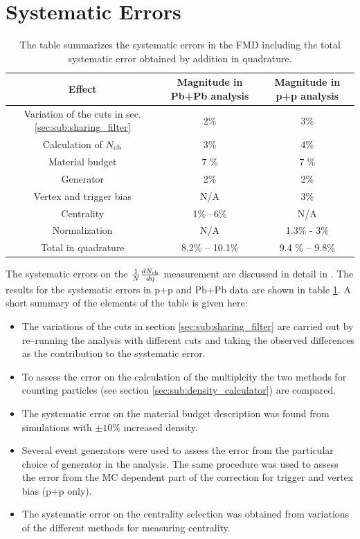 \documentclass[11pt]{article}
\newcommand{\mult}[1][]{\ensuremath N_{\text{ch}#1}}
\newcommand{\dndeta}[1][]{{\ensuremath%
    \ifx|#1|\else\left.\fi%
    \frac{1}{N}\frac{d\mult{}}{d\eta}%
    \ifx|#1|\else\right|_{#1}\fi%
}}
\begin{document}
\section{Systematic Errors} \label{fmdsysterror} 
\begin{table} 
\centering
\begin{tabular}{|c|c|c|}
\hline
 Effect & Magnitude in Pb+Pb analysis & Magnitude in p+p
 analysis \\
\hline
 Variation of the cuts in sec. \ref{sec:sub:sharing_filter} & 2\%   &  3\% \\
\hline
Calculation of $\mult$ & 3\%   &  4\% \\
\hline
 Material budget   & 7 \%  & 7 \%  \\
\hline
 Generator    & 2\%  & 2\%   \\
\hline
Vertex and trigger bias    & N/A  &  3\%  \\
\hline
 Centrality   & 1\% --6\%   & N/A  \\
\hline
 Normalization   & N/A  &  1.3\% - 3\% \\
\hline
\hline
Total in quadrature & 8.2\% -- 10.1\% & 9.4 \% -- 9.8\% \\
\hline
\end{tabular}
\caption[Systematic Errors in the FMD]{The table summarizes the
  systematic errors in the FMD including the total systematic error
  obtained by addition in quadrature.} \label{systerrors} 
\end{table}
The systematic errors on the $\dndeta$ measurement are discussed in detail in 
\cite{hhd:2009}. The results for the systematic errors in p+p and
Pb+Pb data are shown in table \ref{systerrors}. A short summary of the elements of the table is given here:
\begin{itemize}
\item The variations of the cuts in section \ref{sec:sub:sharing_filter} are carried out by re--running the analysis with different cuts and taking the observed differences as the contribution to the systematic error.
\item To assess the error on the calculation of the multiplcity the two methods for counting particles (see section \ref{sec:sub:density_calculator}) are compared.
\item The systematic error on the material budget description was found from simulations with $\pm 10 \%$ increased density.
\item Several event generators were used to assess the error from the particular choice of generator in the analysis. The same procedure was used to assess the error from the MC dependent part of the correction for trigger and vertex bias (p+p only). 
\item The systematic error on the centrality selection was obtained from variations of the different methods for measuring centrality. 
\end{itemize}
\end{document}
